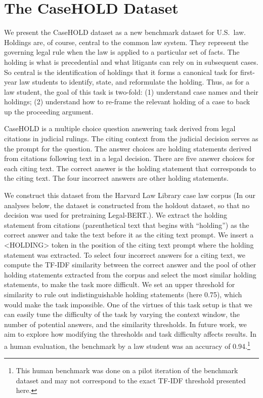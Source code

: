 \documentclass[sigconf]{acmart}
\begin{document}
\section{The CaseHOLD Dataset}
\label{sec:casehold}
We present the CaseHOLD dataset as a new benchmark dataset for U.S.\ law.  Holdings are, of course, central to the common law system. They represent the governing legal rule when the law is applied to a particular set of facts. The holding is what is precedential and what litigants can rely on in subsequent cases. So central is the identification of holdings that it forms a canonical task for first-year law students to identify, state, and reformulate the holding. Thus, as for a law student, the goal of this task is two-fold: (1) understand case names and their holdings; (2) understand how to re-frame the relevant holding of a case to back up the proceeding argument.

CaseHOLD is a multiple choice question answering task derived from legal citations in judicial rulings. The citing context from the judicial decision serves as the prompt for the question. The answer choices are holding statements derived from citations following text in a legal decision. There are five answer choices for each citing text. The correct answer is the holding statement that corresponds to the citing text. The four incorrect answers are other holding statements.

We construct this dataset from the Harvard Law Library case law corpus (In our analyses below, the dataset is constructed from the holdout dataset, so that no decision was used for pretraining Legal-BERT.).  We extract the holding statement from citations (parenthetical text that begins with ``holding'') as the correct answer and take the text before it as the citing text prompt. We insert a <HOLDING> token in the position of the citing text prompt where the holding statement was extracted. To select four incorrect answers for a citing text, we compute the TF-IDF similarity between the correct answer and the pool of other holding statements extracted from the corpus and select the most similar holding statements, to make the task more difficult. We set an upper threshold for similarity to rule out indistinguishable holding statements (here 0.75), which would make the task impossible. One of the virtues of this task setup is that we can easily tune the difficulty of the task by varying the context window, the number of potential answers, and the similarity thresholds. In future work, we aim to explore how modifying the thresholds and task difficulty affects results. In a human evaluation, the benchmark by a law student was an accuracy of 0.94.\footnote{This human benchmark was done on a pilot iteration of the benchmark dataset and may not correspond to the exact TF-IDF threshold presented here.} 
\end{document}
